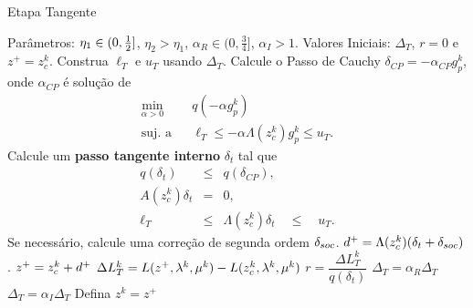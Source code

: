 \begin{algorithm}[H]
\caption{Etapa Tangente}
\begin{algorithmic}[1]
\State Parâmetros: $\eta_1 \in (0,\frac{1}{2}]$, $\eta_2 > \eta_1$, $\alpha_R \in
(0,\frac{3}{4}]$, $\alpha_I > 1$.
\State Valores Iniciais: $\Delta_T$, $r = 0$ e $z^+ = z_c^k$.
  \State Construa $\ell_T$ e $u_T$ usando $\Delta_T$.
  \State Calcule o Passo de Cauchy $\delta_{CP} = -\alpha_{CP}g_p^k$, onde
  $\alpha_{CP}$ é solução de 
  \begin{eqnarray*}
    \min_{\alpha > 0} & & q(-\alpha g_p^k) \\
    \mbox{suj. a}  & & \ell_T \leq -\alpha \Lambda(z_c^k) g_p^k \leq u_T.
  \end{eqnarray*}
  \State Calcule um {\bf passo tangente interno} $\delta_t$ tal que
    \begin{eqnarray*}
      q(\delta_t) & \leq & q(\delta_{CP}), \\
      A(z_c^k)\delta_t & = & 0, \\
      \ell_T & \leq & \Lambda(z_c^k)\delta_t \quad \leq \quad u_T.
    \end{eqnarray*}
  \State Se necessário, calcule uma correção de segunda ordem $\delta_{soc}$.
  \State $d^{+} = \Lambda(z_c^k) (\delta_t + \delta_{soc})$.
  \State $z^+ = z_c^k + d^{+}$
  \State $\Delta L_T^k = L(z^+,\lambda^{k},\mu^k) - L(z_c^k,\lambda^{k},\mu^k)$
  \State $r = \dfrac{ \Delta L_T^k }{ q(\delta_t) }$
    \State $\Delta_T = \alpha_R\Delta_T$
    \State $\Delta_T = \alpha_I\Delta_T$
  \EndIf
\EndWhile
\State Defina $z^k = z^+$
\end{algorithmic}
\end{algorithm}

